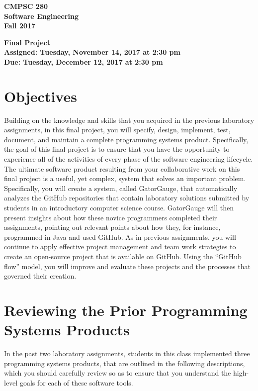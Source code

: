 \documentclass[11pt]{article}
\newcommand{\assignmentduedate}{December 12}
\newcommand{\assignmentassignedate}{November 14}
\newcommand{\labyear}{2017}
\newcommand{\labday}{Tuesday}
\newcommand{\labtime}{2:30 pm}
\newcommand{\assigneddate}{Assigned: \labday, \assignmentassignedate, \labyear{} at \labtime{}}
\newcommand{\duedate}{Due: \labday, \assignmentduedate, \labyear{} at \labtime{}}
\newcommand{\labtitle}[1]
{
  \begin{center}
    \begin{center}
      \bf
      CMPSC 280\\Software Engineering\\
      Fall 2017\\
      \medskip
    \end{center}
    \bf
    #1
  \end{center}
}
\begin{document}
\thispagestyle{empty}

\labtitle{Final Project \\ \assigneddate{} \\ \duedate{}}

\section*{Objectives}


Building on the knowledge and skills that you acquired in the previous laboratory assignments, in this final project,
you will specify, design, implement, test, document, and maintain a complete programming systems product. Specifically,
the goal of this final project is to ensure that you have the opportunity to experience all of the activities of every
phase of the software engineering lifecycle. The ultimate software product resulting from your collaborative work on
this final project is a useful, yet complex, system that solves an important problem. Specifically, you will create a
system, called GatorGauge, that automatically analyzes the GitHub repositories that contain laboratory solutions
submitted by students in an introductory computer science course. GatorGauge will then present insights about how these
novice programmers completed their assignments, pointing out relevant points about how they, for instance, programmed in
Java and used GitHub. As in previous assignments, you will continue to apply effective project management and team work
strategies to create an open-source project that is available on GitHub. Using the ``GitHub flow'' model, you will
improve and evaluate these projects and the processes that governed their creation.

\section*{Reviewing the Prior Programming Systems Products}

In the past two laboratory assignments, students in this class implemented three programming systems products, that are
outlined in the following descriptions, which you should carefully review so as to ensure that you understand the
high-level goals for each of these software tools.
\end{document}
